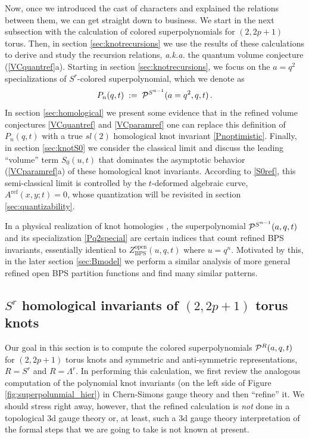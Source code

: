 \documentclass[hyper,letterpaper]{JHEP3}
\newcommand{\be}{\begin{equation}}
\newcommand{\ee}{\end{equation}}
\renewcommand{\P}{{\cal P}}
\begin{document}
Now, once we introduced the cast of characters and explained the relations between them,
we can get straight down to business.
We start in the next subsection with the calculation of colored superpolynomials for $(2,2p+1)$ torus.
Then, in section \ref{sec:knotrecursions} we use the results of these calculations to derive and study
the recursion relations, {\it a.k.a.} the quantum volume conjecture (\ref{VCquantref}a).
Starting in section \ref{sec:knotrecursions}, we focus on the $a=q^2$ specializations
of $S^r$-colored superpolynomial, which we denote as
\be
P_n (q,t) \; := \; \P^{S^{n-1}} (a=q^2,q,t) \,.
\label{Pq2special}
\ee
In section \ref{sec:homological} we present some evidence that in the refined volume conjectures \eqref{VCquantref} and \eqref{VCparamref}
one can replace this definition of $P_n (q,t)$ with a true $sl(2)$ homological knot invariant \eqref{Pnoptimistic}.
Finally, in section \ref{sec:knotS0} we consider the classical limit and discuss
the leading ``volume'' term $S_0 (u,t)$ that dominates the asymptotic behavior (\ref{VCparamref}a)
of these homological knot invariants.
According to \eqref{S0ref}, this semi-classical limit is controlled by the $t$-deformed
algebraic curve, $A^{\text{ref}} (x,y;t) = 0$, whose quantization will be revisited in section \ref{sec:quantizability}.

In a physical realization of knot homologies \cite{GSV}, the superpolynomial $\P^{S^{n-1}} (a,q,t)$
and its specialization \eqref{Pq2special} are certain indices that count refined BPS invariants,
essentially identical to $Z_{\text{BPS}}^{\text{open}} (u,q,t)$ where $u = q^n$.
Motivated by this, in the later section \ref{sec:Bmodel} we perform a similar analysis
of more general refined open BPS partition functions and find many similar patterns.

\subsection{$S^r$ homological invariants of $(2,2p+1)$ torus knots}

Our goal in this section is to compute the colored superpolynomials $\P^{R} (a,q,t)$
for $(2,2p+1)$ torus knots and symmetric and anti-symmetric representations, $R=S^r$ and $R=\Lambda^r$.
In performing this calculation, we first review the analogous computation of the polynomial knot
invariants (on the left side of Figure \ref{fig:superpolunmial_hier}) in Chern-Simons gauge theory and then ``refine'' it.
We should stress right away, however, that the refined calculation is {\it not} done in a topological 3d gauge theory
or, at least, such a 3d gauge theory interpretation of the formal steps that we are going to take is not known at present.
\end{document}

